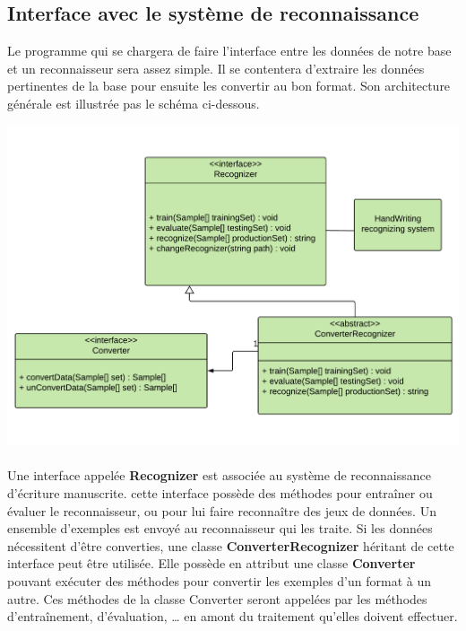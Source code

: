 \subsection{Interface avec le système de reconnaissance}

Le programme qui se chargera de faire l’interface entre les données de notre base et un reconnaisseur sera assez simple. Il se contentera d’extraire les données pertinentes de la base pour ensuite les convertir au bon format. Son architecture générale est illustrée pas le schéma ci-dessous.

\newpage

\begin{mdframed}[frametitle={Figure 9 : Diagramme de classes de l'interface avec le système de reconaissance d'écriture manuscrite}, innerbottommargin=10]
\begin{center}
\includegraphics[scale=0.5]{interface-reconnaisseur.pdf}
\end{center}
\end{mdframed}

\paragraph{}
Une interface appelée \textbf{Recognizer} est associée au système de reconnaissance d’écriture manuscrite. cette interface possède des méthodes pour entraîner ou  évaluer le reconnaisseur, ou pour lui faire reconnaître des jeux de données. Un ensemble d’exemples est envoyé au reconnaisseur qui les traite.
Si les données nécessitent d’être converties, une classe \textbf{ConverterRecognizer} héritant de cette interface peut être utilisée. Elle possède en attribut une classe \textbf{Converter} pouvant exécuter des méthodes pour convertir les exemples d’un format à un autre. Ces méthodes de la classe Converter seront appelées par les méthodes d’entraînement, d’évaluation, … en amont du traitement qu’elles doivent effectuer.


